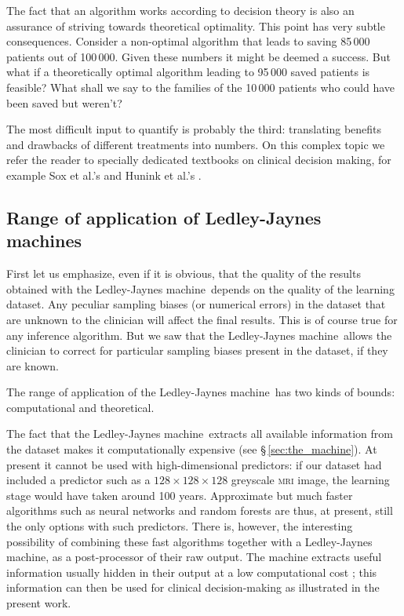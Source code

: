 \documentclass[utf8]{FrontiersinHarvard_mod} %
\newcommand*{\sect}{\S}%
\newcommand*{\etal}{{et al.}}
\renewcommand*{\|}[1][]{\nonscript\:#1\vert\nonscript\:\mathopen{}}
\newcommand*{\ljm}{Ledley-Jaynes machine}
\begin{document}
The fact that an algorithm works according to decision theory is also an assurance of striving towards theoretical optimality. This point has very subtle consequences. Consider a non-optimal algorithm that leads to saving 85\,000 patients out of 100\,000. Given these numbers it might be deemed a success. But what if a theoretically optimal algorithm leading to 95\,000 saved patients is feasible? What shall we say to the families of the 10\,000 patients who could have been saved but weren't?


The most difficult input to quantify is probably the third: translating benefits and drawbacks of different treatments into numbers. On this complex topic we refer the reader to specially dedicated textbooks on clinical decision making, for example Sox \etal's \citeyearpar{soxetal1988_r2013} and Hunink \etal's \citeyearpar{huninketal2001_r2014}.



\subsection{Range of application of \ljm s}
\label{sec:rangeLJM}

First let us emphasize, even if it is obvious, that the quality of the results obtained with the \ljm\ depends on the quality of the learning dataset. Any peculiar sampling biases (or numerical errors) in the dataset that are unknown to the clinician will affect the final results. This is of course true for any inference algorithm. But we saw that the \ljm\ allows the clinician to correct for particular sampling biases present in the dataset, if they are known.

The range of application of the \ljm\ has two kinds of bounds: computational and theoretical.

The fact that the \ljm\ extracts all available information from the dataset makes it computationally expensive (see \sect\,\ref{sec:the_machine}). At present it cannot be used with high-dimensional predictors: if our dataset had included a predictor such as a $128\times128\times128$ greyscale \textsc{mri} image, the learning stage would have taken around 100 years. Approximate but much faster algorithms such as neural networks and random forests are thus, at present, still the only options with such predictors. There is, however, the interesting possibility of combining these fast algorithms together with a \ljm, as a post-processor of their raw output. The machine extracts useful information usually hidden in their output at a low computational cost \citep{dyrlandetal2022b}; this information can then be used for clinical decision-making as illustrated in the present work.
\end{document}
